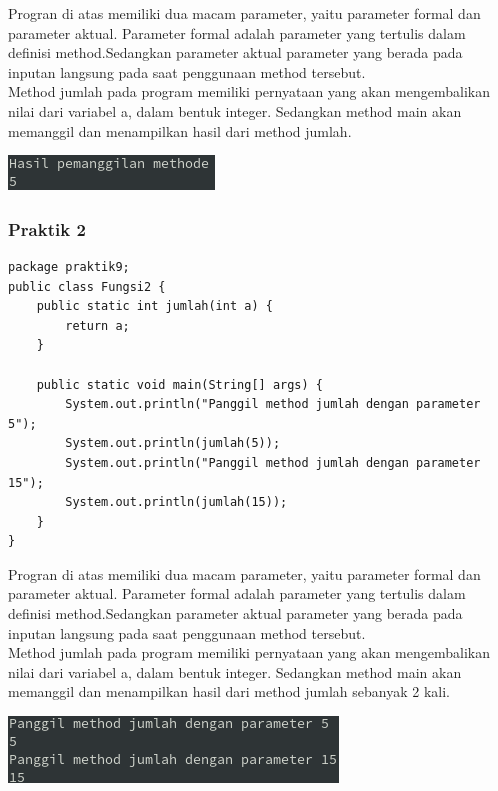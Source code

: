 \documentclass[a4paper,12pt]{article}
\begin{document}
Progran di atas memiliki dua macam parameter, yaitu parameter formal dan parameter aktual. Parameter formal adalah
parameter yang tertulis dalam definisi method.Sedangkan parameter aktual parameter yang berada pada inputan langsung
pada saat penggunaan method tersebut.\\

Method jumlah pada program memiliki pernyataan yang akan mengembalikan nilai dari variabel a, dalam bentuk integer.
Sedangkan method main akan memanggil dan menampilkan hasil dari method jumlah.

\begin{center}
    \includegraphics[scale=1]{1.png} 
\end{center}

\subsubsection{Praktik 2}
\begin{lstlisting}
package praktik9;
public class Fungsi2 {
    public static int jumlah(int a) {
        return a;
    }

    public static void main(String[] args) {
        System.out.println("Panggil method jumlah dengan parameter 5");
        System.out.println(jumlah(5));
        System.out.println("Panggil method jumlah dengan parameter 15");
        System.out.println(jumlah(15));
    }
}
\end{lstlisting}
Progran di atas memiliki dua macam parameter, yaitu parameter formal dan parameter aktual. Parameter formal adalah
parameter yang tertulis dalam definisi method.Sedangkan parameter aktual parameter yang berada pada inputan langsung
pada saat penggunaan method tersebut.\\

Method jumlah pada program memiliki pernyataan yang akan mengembalikan nilai dari variabel a, dalam bentuk integer.
Sedangkan method main akan memanggil dan menampilkan hasil dari method jumlah sebanyak 2 kali.

\begin{center}
    \includegraphics[scale=1]{2.png} 
\end{center}
\end{document}
